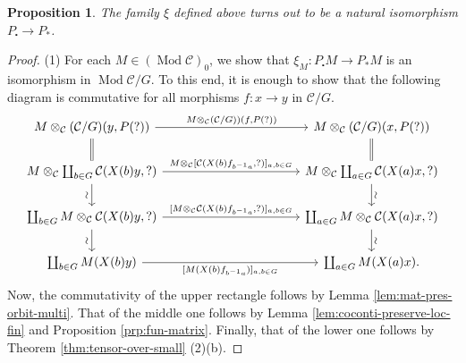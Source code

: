 \documentclass{surv-l}
\numberwithin{equation}{chapter}
\numberwithin{figure}{chapter}
\theoremstyle{plain}
\newtheorem{prp}[thm]{Proposition}
\theoremstyle{definition}
\theoremstyle{remark}
\newcommand{\Ar}[3]{\ar[from={#1}, to={#2}, #3]}
\DeclareMathOperator{\Mod}{Mod}
\begin{document}
\begin{prp}
The family $\xi$ defined above turns out to be a natural isomorphism $P_{\centerdot} \to P_*$.
\end{prp}

\begin{proof}
(1) For each $M \in (\Mod{\mathcal{C}})_0$, we show that
$\xi_M \colon P_{\centerdot} M \to P_* M$ is an isomorphism in $\Mod {\mathcal{C}}/G$.
To this end, it is enough to show that the following diagram is commutative
for all morphisms $f \colon x \to y$ in ${\mathcal{C}}/G$.
\begin{equation*}
\begin{tikzcd}[column sep=11em]
M \otimes_{\mathcal{C}} ({\mathcal{C}}/G)(y, P(?)) & M \otimes_{\mathcal{C}} ({\mathcal{C}}/G)(x, P(?))\\
M \otimes_{\mathcal{C}} \coprod_{b\in G}{\mathcal{C}}(X(b)y, ?) & M \otimes_{\mathcal{C}} \coprod_{a\in G} {\mathcal{C}}(X(a)x, ?)\\
\coprod_{b\in G} M \otimes_{\mathcal{C}} {\mathcal{C}}(X(b)y, ?) & \coprod_{a\in G} M \otimes_{\mathcal{C}}  {\mathcal{C}}(X(a)x, ?)\\
\coprod_{b\in G} M(X(b)y) & \coprod_{a\in G} M(X(a)x).
\Ar{1-1}{1-2}{"{M \otimes_{\mathcal{C}} ({\mathcal{C}}/G))(f, P(?))}"}
\Ar{2-1}{2-2}{"{M \otimes_{\mathcal{C}} [{\mathcal{C}}(X(b)f_{b^{-1} a},?)]_{a,b \in G}}"}
\Ar{3-1}{3-2}{"{[M \otimes_{\mathcal{C}} {\mathcal{C}}(X(b)f_{b^{-1} a},?)]_{a,b \in G}}"}
\Ar{4-1}{4-2}{"{[M(X(b)f_{b^{-1} a})]_{a,b \in G}}" '}
\Ar{1-1}{2-1}{equal}
\Ar{1-2}{2-2}{equal}
\Ar{2-1}{3-1}{"\rotatebox{90}{$\sim$}" '}
\Ar{2-2}{3-2}{"\rotatebox{90}{$\sim$}"}
\Ar{3-1}{4-1}{"\rotatebox{90}{$\sim$}" '}
\Ar{3-2}{4-2}{"\rotatebox{90}{$\sim$}"}
\end{tikzcd}
\end{equation*}
Now, the commutativity of the upper rectangle follows by
Lemma \ref{lem:mat-pres-orbit-multi}.
That of the middle one follows by Lemma \ref{lem:coconti-preserve-loc-fin}
and Proposition \ref{prp:fun-matrix}.
Finally, that of the lower one follows by Theorem \ref{thm:tensor-over-small} (2)(b).


\end{proof}
\end{document}
